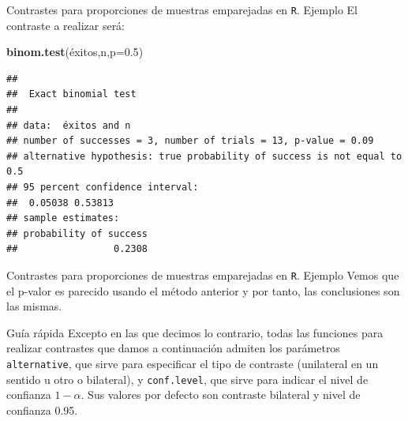 \documentclass[
  ignorenonframetext,
]{beamer}
\newenvironment{Shaded}{\begin{snugshade}}{\end{snugshade}}
\newcommand{\DataTypeTok}[1]{\textcolor[rgb]{0.13,0.29,0.53}{#1}}
\newcommand{\FloatTok}[1]{\textcolor[rgb]{0.00,0.00,0.81}{#1}}
\newcommand{\KeywordTok}[1]{\textcolor[rgb]{0.13,0.29,0.53}{\textbf{#1}}}
\newcommand{\NormalTok}[1]{#1}
\begin{document}
\begin{frame}[fragile]{Contrastes para proporciones de muestras
emparejadas en \texttt{R}. Ejemplo}
\protect\hypertarget{contrastes-para-proporciones-de-muestras-emparejadas-en-r.-ejemplo-7}{}
El contraste a realizar será:

\begin{Shaded}
\begin{Highlighting}[]
\KeywordTok{binom.test}\NormalTok{(éxitos,n,}\DataTypeTok{p=}\FloatTok{0.5}\NormalTok{)}
\end{Highlighting}
\end{Shaded}

\begin{verbatim}
## 
##  Exact binomial test
## 
## data:  éxitos and n
## number of successes = 3, number of trials = 13, p-value = 0.09
## alternative hypothesis: true probability of success is not equal to 0.5
## 95 percent confidence interval:
##  0.05038 0.53813
## sample estimates:
## probability of success 
##                 0.2308
\end{verbatim}
\end{frame}

\begin{frame}{Contrastes para proporciones de muestras emparejadas en
\texttt{R}. Ejemplo}
\protect\hypertarget{contrastes-para-proporciones-de-muestras-emparejadas-en-r.-ejemplo-8}{}
Vemos que el p-valor es parecido usando el método anterior y por tanto,
las conclusiones son las mismas.
\end{frame}

\begin{frame}[fragile]{Guía rápida}
\protect\hypertarget{guuxeda-ruxe1pida}{}
Excepto en las que decimos lo contrario, todas las funciones para
realizar contrastes que damos a continuación admiten los parámetros
\texttt{alternative}, que sirve para especificar el tipo de contraste
(unilateral en un sentido u otro o bilateral), y \texttt{conf.level},
que sirve para indicar el nivel de confianza \(1-\alpha\). Sus valores
por defecto son contraste bilateral y nivel de confianza 0.95.
\end{frame}
\end{document}
